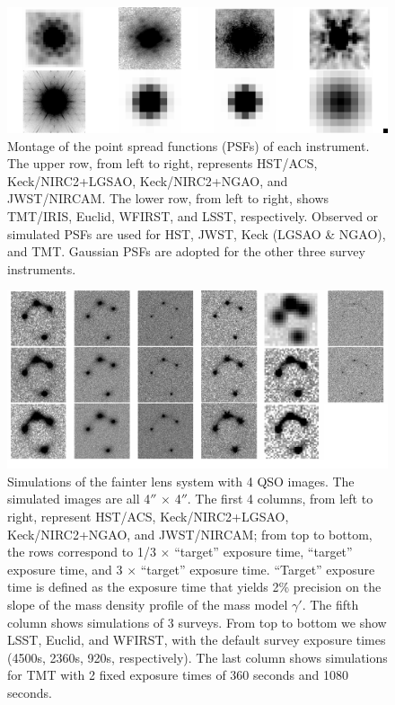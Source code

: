 \documentclass[a4paper,11pt]{article}
\begin{document}
\begin{figure}
\begin{center}
\includegraphics[width=1.0\textwidth]{figures/PSF_montage.png}
\end{center}
\caption{Montage of the point spread functions (PSFs) of each instrument. The upper row, from left to right, represents HST/ACS, Keck/NIRC2+LGSAO, Keck/NIRC2+NGAO, and JWST/NIRCAM. The lower row, from left to right, shows TMT/IRIS, Euclid, WFIRST, and LSST, respectively. Observed or simulated PSFs are used for HST, JWST, Keck (LGSAO \& NGAO), and TMT. Gaussian PSFs are adopted for the other three survey instruments.}
\label{fig:PSF_montage}
\end{figure}



\begin{figure}
\begin{center}
\includegraphics[width=1.0\textwidth]{figures/fainter_system_4QSOimages_all.png}
\end{center}
\caption{Simulations of the fainter lens system with 4 QSO images. The simulated images are all 4$''$ $\times$ 4$''$. The first 4 columns, from left to right, represent HST/ACS, Keck/NIRC2+LGSAO, Keck/NIRC2+NGAO, and JWST/NIRCAM; from top to bottom, the rows correspond to 1/3 $\times$ ``target'' exposure time, ``target'' exposure time, and 3 $\times$ ``target'' exposure time. ``Target'' exposure time is defined as the exposure time that yields 2\% precision on the slope of the mass density profile of the mass model $\gamma'$. The fifth column shows simulations of 3 surveys. From top to bottom we show LSST, Euclid, and WFIRST, with the default survey exposure times (4500s, 2360s, 920s, respectively). The last column shows simulations for TMT with 2 fixed exposure times of 360 seconds and 1080 seconds.}
\label{fig:fainter_4QSOimages_montage}
\end{figure}
\end{document}
